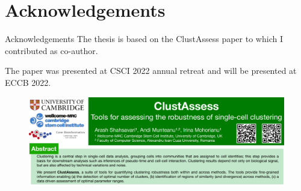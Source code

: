 \section{Acknowledgements}

\begin{frame}{Acknowledgements}
    The thesis is based on the ClustAssess paper to which I contributed as co-author.

    The paper was presented at CSCI 2022 annual retreat and will be presented at ECCB 2022.

    \begin{figure}
        \includegraphics[width=\textwidth]{images/ca.png}
    \end{figure}
\end{frame}